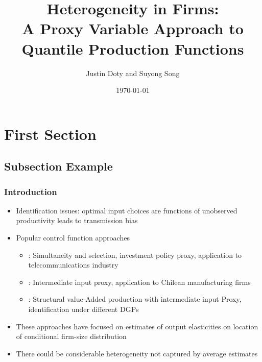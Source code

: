 \documentclass{beamer}
\title[Quantile Production Functions]{Heterogeneity in Firms:\\
A Proxy Variable Approach to Quantile Production Functions}
\author{Justin Doty and Suyong Song} %
\institute[] %
{
\\  
\medskip %
}
\date{\today} %
\begin{document}
\begin{frame}
\titlepage %
\end{frame}


\section{First Section} %

\subsection{Subsection Example} %

\begin{frame}
\frametitle{Introduction}
\begin{itemize}
\item Identification issues: optimal input choices are functions of unobserved productivity leads to transmission bias
\item Popular control function approaches
\begin{itemize}
	\item \textcite{Olley1996}: Simultaneity and selection, investment policy proxy, application to telecommunications industry
	\item \textcite{Levinsohn2003}: Intermediate input proxy, application to Chilean manufacturing firms
	\item \textcite{Ackerberg2015}: Structural value-Added production with intermediate input Proxy, identification under different DGPs
\end{itemize}
\item These approaches have focused on estimates of output elasticities on location of conditional firm-size distribution
\item There could be considerable heterogeneity not captured by average estimates
\end{itemize}
\end{frame}
\end{document}
